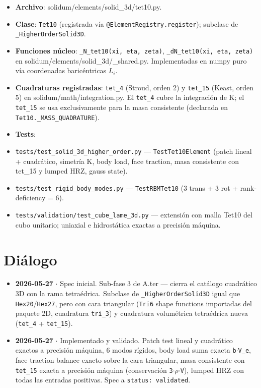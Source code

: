\documentclass[11pt,letterpaper,oneside]{report}
\begin{document}
\begin{itemize}
  \item \textbf{Archivo}: solidum/elements/solid\_3d/tet10.py.
  \item \textbf{Clase}: \texttt{Tet10} (registrada vía \texttt{@ElementRegistry.register}); subclase de \texttt{\_HigherOrderSolid3D}.
  \item \textbf{Funciones núcleo}: \texttt{\_N\_tet10(xi, eta, zeta)}, \texttt{\_dN\_tet10(xi, eta, zeta)} en solidum/elements/solid\_3d/\_shared.py. Implementadas en numpy puro vía coordenadas baricéntricas $L_i$.
  \item \textbf{Cuadraturas registradas}: \texttt{tet\_4} (Stroud, orden 2) y \texttt{tet\_15} (Keast, orden 5) en solidum/math/integration.py. El \texttt{tet\_4} cubre la integración de K; el \texttt{tet\_15} se usa exclusivamente para la masa consistente (declarada en \texttt{Tet10.\_MASS\_QUADRATURE}).
  \item \textbf{Tests}:
  \item \texttt{tests/test\_solid\_3d\_higher\_order.py} --- \texttt{TestTet10Element} (patch lineal + cuadrático, simetría K, body load, face traction, masa consistente con tet\_15 y lumped HRZ, gauss state).
  \item \texttt{tests/test\_rigid\_body\_modes.py} --- \texttt{TestRBMTet10} (3 trans + 3 rot + rank-deficiency = 6).
  \item \texttt{tests/validation/test\_cube\_lame\_3d.py} --- extensión con malla Tet10 del cubo unitario; uniaxial e hidrostática exactas a precisión máquina.
\end{itemize}


\section{Diálogo}

\begin{itemize}
  \item \textbf{2026-05-27} \ensuremath{\cdot} Spec inicial. Sub-fase 3 de A.ter --- cierra el catálogo cuadrático 3D con la rama tetraédrica. Subclase de \texttt{\_HigherOrderSolid3D} igual que \texttt{Hex20}/\texttt{Hex27}, pero con cara triangular (\texttt{Tri6} shape functions importadas del paquete 2D, cuadratura \texttt{tri\_3}) y cuadratura volumétrica tetraédrica nueva (\texttt{tet\_4} + \texttt{tet\_15}).
  \item \textbf{2026-05-27} \ensuremath{\cdot} Implementado y validado. Patch test lineal y cuadrático exactos a precisión máquina, 6 modos rígidos, body load suma exacta \texttt{b\ensuremath{\cdot}V\_e}, face traction balance exacto sobre la cara triangular, masa consistente con \texttt{tet\_15} exacta a precisión máquina (conservación \texttt{3\ensuremath{\cdot}\ensuremath{\rho}\ensuremath{\cdot}V}), lumped HRZ con todas las entradas positivas. Spec a \texttt{status: validated}.
\end{itemize}
\end{document}
